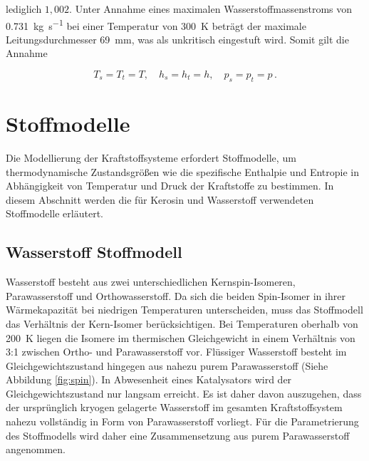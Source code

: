 lediglich $1,002$. Unter Annahme eines maximalen Wasserstoffmassenstroms von \SI{0.731}{\kg\per\s} bei einer Temperatur von \SI{300}{\K} beträgt der maximale Leitungsdurchmesser \SI{69}{\milli\m}, was als unkritisch eingestuft wird. Somit gilt die Annahme 

\begin{equation}\label{Eq:ts}
	T_s=T_t=T,\quad h_s=h_t=h,\quad p_s=p_t=p\,.
\end{equation}

\section{Stoffmodelle}

Die Modellierung der Kraftstoffsysteme erfordert Stoffmodelle, um thermodynamische Zustandsgrößen wie die spezifische Enthalpie und Entropie in Abhängigkeit von Temperatur und Druck der Kraftstoffe zu bestimmen. In diesem Abschnitt werden die für Kerosin und Wasserstoff verwendeten Stoffmodelle erläutert.

\subsection{Wasserstoff Stoffmodell}

Wasserstoff besteht aus zwei unterschiedlichen Kernspin-Isomeren, Parawasserstoff und Orthowasserstoff. Da sich die beiden Spin-Isomer in ihrer Wärmekapazität bei niedrigen Temperaturen unterscheiden, muss das Stoffmodell das Verhältnis der Kern-Isomer berücksichtigen. Bei Temperaturen oberhalb von \SI{200}{\K} liegen die Isomere im thermischen Gleichgewicht in einem Verhältnis von 3:1 zwischen Ortho- und Parawasserstoff vor. Flüssiger Wasserstoff besteht im Gleichgewichtszustand hingegen aus nahezu purem Parawasserstoff (Siehe Abbildung \ref{fig:spin}). In Abwesenheit eines Katalysators wird der Gleichgewichtszustand nur langsam erreicht. Es ist daher davon auszugehen, dass der ursprünglich kryogen gelagerte Wasserstoff im gesamten Kraftstoffsystem nahezu vollständig in Form von Parawasserstoff vorliegt. Für die Parametrierung des Stoffmodells wird daher eine Zusammensetzung aus purem Parawasserstoff angenommen. \cite{Buntkowsky.2022}

